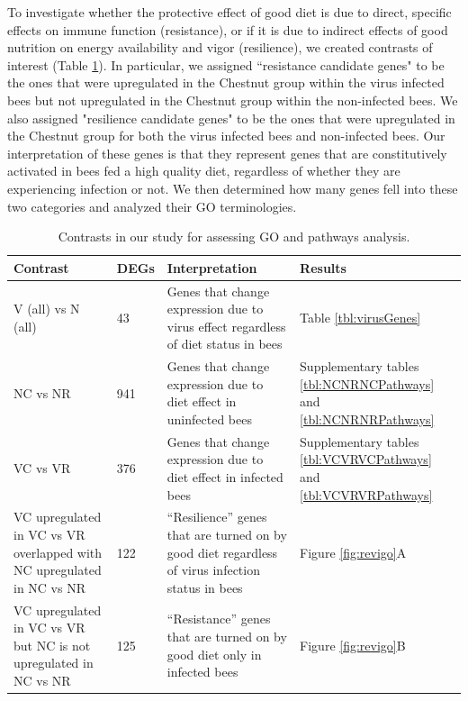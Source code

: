 \documentclass[11pt,a4paper,oldfontcommands,openany]{memoir}
\numberwithin{equation}{section} %
\begin{document}
To investigate whether the protective effect of good diet is due to direct, specific effects on immune function (resistance), or if it is due to indirect effects of good nutrition on energy availability and vigor (resilience), we created contrasts of interest (Table \ref{tbl:contrasts}). In particular, we assigned ``resistance candidate genes" to be the ones that were upregulated in the Chestnut group within the virus infected bees but not upregulated in the Chestnut group within the non-infected bees. We also assigned "resilience candidate genes" to be the ones that were upregulated in the Chestnut group for both the virus infected bees and non-infected bees. Our interpretation of these genes is that they represent genes that are constitutively activated in bees fed a high quality diet, regardless of whether they are experiencing infection or not. We then determined how many genes fell into these two categories and analyzed their GO terminologies.

\begin{table}[H]
\begin{tabular}{ | m{4.4cm} | m{0.9cm}| m{5.5cm} | m{2.6cm} | } 
\hline
Contrast & DEGs & Interpretation & Results \\ 
\hline
V (all) vs N (all) & 43 & Genes that change expression due to virus effect regardless of diet status in bees & Table \ref{tbl:virusGenes} \\ 
\hline
NC vs NR & 941 & Genes that change expression due to diet effect in uninfected bees & Supplementary tables \ref{tbl:NCNRNCPathways} and \ref{tbl:NCNRNRPathways} \\ 
\hline
VC vs VR & 376 & Genes that change expression due to diet effect in infected bees & Supplementary tables \ref{tbl:VCVRVCPathways} and \ref{tbl:VCVRVRPathways} \\ 
\hline
VC upregulated in VC vs VR overlapped with NC upregulated in NC vs NR & 122 & ``Resilience'' genes that are turned on by good diet regardless of virus infection status in bees & Figure \ref{fig:revigo}A \\
\hline
VC upregulated in VC vs VR but NC is not upregulated in NC vs NR & 125 & ``Resistance'' genes that are turned on by good diet only in infected bees & Figure \ref{fig:revigo}B \\
\hline
\end{tabular}
\caption{Contrasts in our study for assessing GO and pathways analysis.}
  \label{tbl:contrasts}
\end{table}
\end{document}
